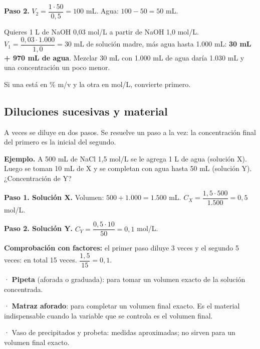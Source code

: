  

\textbf{Paso 2.} $V_2 = \dfrac{1 \cdot 50}{0{,}5} = 100$ mL. Agua: $100 - 50 = 50$ mL.

  
\begin{clave} Quieres 1 L de NaOH 0,03 mol/L a partir de NaOH 1,0 mol/L. $V_1 = \dfrac{0{,}03 \cdot 1.000}{1{,}0} = 30$ mL de solución madre, más agua hasta 1.000 mL: \textbf{30 mL + 970 mL de agua}. Mezclar 30 mL con 1.000 mL de agua daría 1.030 mL y una concentración un poco menor.\end{clave}
 
\begin{ojo} Si una está en \% m/v y la otra en mol/L, convierte primero.\end{ojo}
\subsection{Diluciones sucesivas y material}
A veces se diluye en dos pasos. Se resuelve un paso a la vez: la concentración final del primero es la inicial del segundo.

 

\textbf{Ejemplo.} A 500 mL de NaCl 1,5 mol/L se le agrega 1 L de agua (solución X). Luego se toman 10 mL de X y se completan con agua hasta 50 mL (solución Y). ¿Concentración de Y?

 

\textbf{Paso 1. Solución X.} Volumen: $500 + 1.000 = 1.500$ mL. $C_X = \dfrac{1{,}5 \cdot 500}{1.500} = 0{,}5$ mol/L.

 

\textbf{Paso 2. Solución Y.} $C_Y = \dfrac{0{,}5 \cdot 10}{50} = 0{,}1$ mol/L.

 

\textbf{Comprobación con factores:} el primer paso diluye 3 veces y el segundo 5 veces: en total 15 veces. $\dfrac{1{,}5}{15} = 0{,}1$. 

  
\begin{clave} · \textbf{Pipeta} (aforada o graduada): para tomar un volumen exacto de la solución concentrada.\par · \textbf{Matraz aforado}: para completar un volumen final exacto. Es el material indispensable cuando la variable que se controla es el volumen final.\par · Vaso de precipitados y probeta: medidas aproximadas; no sirven para un volumen final exacto.\end{clave}
 
